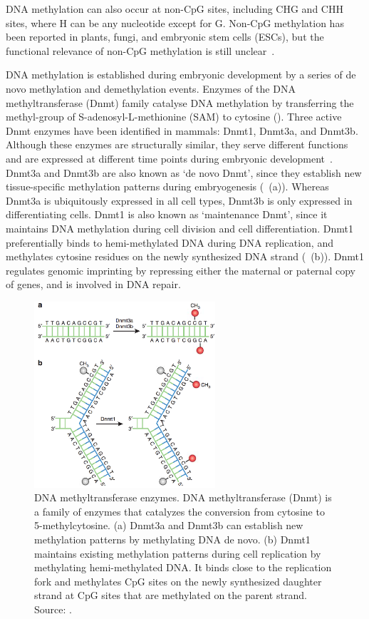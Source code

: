 DNA methylation can also occur at non-CpG sites, including CHG and CHH sites, where H can be any nucleotide except for G. Non-CpG methylation has been reported in plants, fungi, and embryonic stem cells (ESCs), but the functional relevance of non-CpG methylation is still unclear~\citep{jones_functions_2012,ziller_genomic_2011,ramsahoye_non-cpg_2000,shirane_mouse_2013}.

DNA methylation is established during embryonic development by a series of de novo methylation and demethylation events. Enzymes of the DNA methyltransferase (Dnmt) family catalyse DNA methylation by transferring the methyl-group of S-adenosyl-L-methionine (SAM) to cytosine (). Three active Dnmt enzymes have been identified in mammals: Dnmt1, Dnmt3a, and Dnmt3b. Although these enzymes are structurally similar, they serve different functions and are expressed at different time points during embryonic development~\citep{moore_dna_2013,jones_rethinking_2009,bestor_notes_2015}. Dnmt3a and Dnmt3b are also known as `de novo Dnmt', since they establish new tissue-specific methylation patterns during embryogenesis (~(a)). Whereas Dnmt3a is ubiquitously expressed in all cell types, Dnmt3b is only expressed in differentiating cells. Dnmt1 is also known as `maintenance Dnmt', since it maintains DNA methylation during cell division and cell differentiation. Dnmt1 preferentially binds to hemi-methylated DNA during DNA replication, and methylates cytosine residues on the newly synthesized DNA strand (~(b)). Dnmt1 regulates genomic imprinting by repressing either the maternal or paternal copy of genes, and is involved in DNA repair.
\begin{figure}[htbp!]
\centering
\includegraphics[width=0.6\textwidth]{dnmt}
\caption[DNA methyltransferase enzymes.]{DNA methyltransferase enzymes. DNA methyltransferase (Dnmt) is a family of enzymes that catalyzes the conversion from cytosine to 5-methylcytosine. (a) Dnmt3a and Dnmt3b can establish new methylation patterns by methylating DNA de novo. (b) Dnmt1 maintains existing methylation patterns during cell replication by methylating hemi-methylated DNA. It binds close to the replication fork and methylates CpG sites on the newly synthesized daughter strand at CpG sites that are methylated on the parent strand. Source: \citet{moore_dna_2013}.}
\label{fig:intro_dnmt}
\end{figure}

